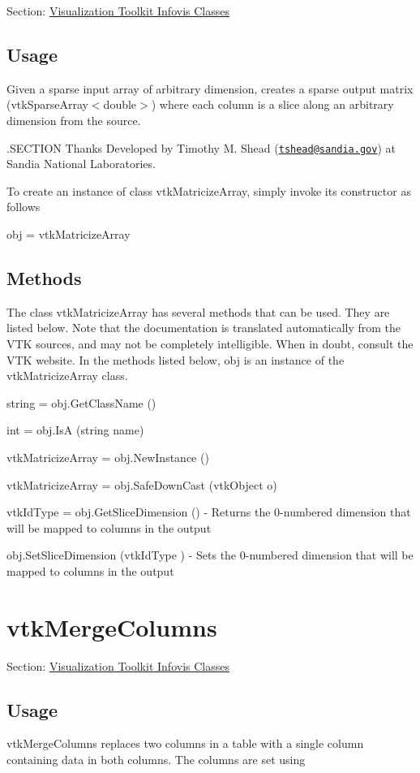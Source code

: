 Section\-: \hyperlink{sec_vtkinfovis}{Visualization Toolkit Infovis Classes} \hypertarget{vtkwidgets_vtkxyplotwidget_Usage}{}\subsection{Usage}\label{vtkwidgets_vtkxyplotwidget_Usage}
Given a sparse input array of arbitrary dimension, creates a sparse output matrix (vtk\-Sparse\-Array$<$double$>$) where each column is a slice along an arbitrary dimension from the source.

.S\-E\-C\-T\-I\-O\-N Thanks Developed by Timothy M. Shead (\href{mailto:tshead@sandia.gov}{\tt tshead@sandia.\-gov}) at Sandia National Laboratories.

To create an instance of class vtk\-Matricize\-Array, simply invoke its constructor as follows \begin{DoxyVerb}  obj = vtkMatricizeArray
\end{DoxyVerb}
 \hypertarget{vtkwidgets_vtkxyplotwidget_Methods}{}\subsection{Methods}\label{vtkwidgets_vtkxyplotwidget_Methods}
The class vtk\-Matricize\-Array has several methods that can be used. They are listed below. Note that the documentation is translated automatically from the V\-T\-K sources, and may not be completely intelligible. When in doubt, consult the V\-T\-K website. In the methods listed below, {\ttfamily obj} is an instance of the vtk\-Matricize\-Array class. 
\begin{DoxyItemize}
\item {\ttfamily string = obj.\-Get\-Class\-Name ()}  
\item {\ttfamily int = obj.\-Is\-A (string name)}  
\item {\ttfamily vtk\-Matricize\-Array = obj.\-New\-Instance ()}  
\item {\ttfamily vtk\-Matricize\-Array = obj.\-Safe\-Down\-Cast (vtk\-Object o)}  
\item {\ttfamily vtk\-Id\-Type = obj.\-Get\-Slice\-Dimension ()} -\/ Returns the 0-\/numbered dimension that will be mapped to columns in the output  
\item {\ttfamily obj.\-Set\-Slice\-Dimension (vtk\-Id\-Type )} -\/ Sets the 0-\/numbered dimension that will be mapped to columns in the output  
\end{DoxyItemize}\hypertarget{vtkinfovis_vtkmergecolumns}{}\section{vtk\-Merge\-Columns}\label{vtkinfovis_vtkmergecolumns}
Section\-: \hyperlink{sec_vtkinfovis}{Visualization Toolkit Infovis Classes} \hypertarget{vtkwidgets_vtkxyplotwidget_Usage}{}\subsection{Usage}\label{vtkwidgets_vtkxyplotwidget_Usage}
vtk\-Merge\-Columns replaces two columns in a table with a single column containing data in both columns. The columns are set using

